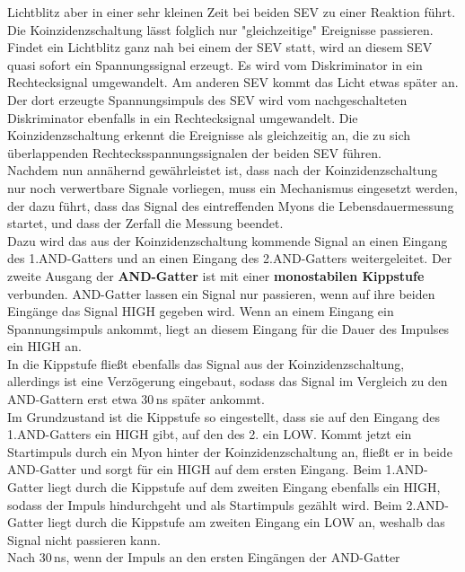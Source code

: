     Lichtblitz aber in einer sehr kleinen Zeit bei beiden SEV zu einer Reaktion
    führt. Die Koinzidenzschaltung lässt folglich nur
    "gleichzeitige" Ereignisse passieren.
    Findet ein Lichtblitz ganz nah bei einem der SEV statt, wird an
    diesem SEV quasi sofort ein Spannungssignal erzeugt. Es wird
    vom Diskriminator in ein Rechtecksignal umgewandelt.
    Am anderen SEV kommt das Licht etwas später an.
    Der dort erzeugte Spannungsimpuls des SEV wird vom nachgeschalteten
    Diskriminator ebenfalls in ein Rechtecksignal umgewandelt.
    Die Koinzidenzschaltung erkennt die Ereignisse
    als gleichzeitig an, die zu sich überlappenden Rechtecksspannungssignalen
    der beiden SEV führen.\\
    Nachdem nun annähernd gewährleistet ist, dass nach der Koinzidenzschaltung
    nur noch verwertbare Signale vorliegen, muss ein Mechanismus eingesetzt
    werden, der dazu führt, dass das Signal des eintreffenden Myons die
    Lebensdauermessung startet, und dass der Zerfall die Messung beendet. \\
    Dazu wird das aus der Koinzidenzschaltung kommende Signal an einen Eingang
    des 1.AND-Gatters und an einen Eingang des 2.AND-Gatters weitergeleitet.
    Der zweite Ausgang der \textbf{AND-Gatter} ist mit einer
    \textbf{monostabilen
    Kippstufe} verbunden.
    AND-Gatter lassen ein Signal nur passieren, wenn auf ihre beiden
    Eingänge das Signal HIGH gegeben wird. Wenn an einem Eingang ein
    Spannungsimpuls ankommt, liegt an diesem Eingang für die Dauer
    des Impulses ein HIGH an.\\
    In die Kippstufe fließt ebenfalls das Signal aus der Koinzidenzschaltung, allerdings
    ist eine Verzögerung eingebaut, sodass das Signal im Vergleich zu den AND-Gattern
    erst etwa 30\,ns später ankommt.\\
    Im Grundzustand ist die Kippstufe so eingestellt, dass sie auf den Eingang
    des 1.AND-Gatters ein HIGH gibt, auf den des 2. ein LOW.
    Kommt jetzt ein Startimpuls durch ein Myon hinter der Koinzidenzschaltung
    an, fließt er in beide AND-Gatter und sorgt für ein HIGH auf dem ersten
    Eingang. Beim 1.AND-Gatter liegt durch die Kippstufe auf dem zweiten
    Eingang ebenfalls ein HIGH, sodass der Impuls hindurchgeht und
    als Startimpuls gezählt wird.
    Beim 2.AND-Gatter liegt durch die Kippstufe am zweiten Eingang ein LOW an,
    weshalb das Signal nicht passieren kann.\\
    Nach 30\,ns, wenn der Impuls an den ersten Eingängen der AND-Gatter
